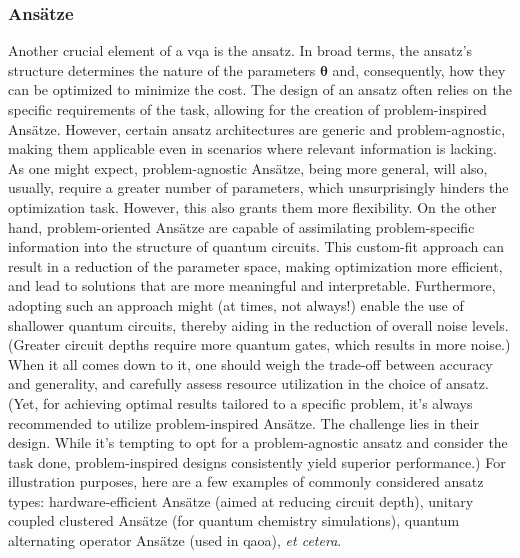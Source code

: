 \subsubsection*{\small Ansätze}
Another crucial element of a \acrshort{vqa} is the ansatz. In broad terms, the ansatz's structure determines the nature of the parameters $\boldsymbol{\theta}$ and, consequently, how they can be optimized to minimize the cost. The design of an ansatz often relies on the specific requirements of the task, allowing for the creation of problem-inspired Ansätze. However, certain ansatz architectures are generic and problem-agnostic, making them applicable even in scenarios where relevant information is lacking. As one might expect, problem-agnostic Ansätze, being more general, will also, usually, require a greater number of parameters, which unsurprisingly hinders the optimization task. However, this also grants them more flexibility. On the other hand, problem-oriented Ansätze are capable of assimilating problem-specific information into the structure of quantum circuits. This custom-fit approach can result in a reduction of the parameter space, making optimization more efficient, and lead to solutions that are more meaningful and interpretable. Furthermore, adopting such an approach might (at times, not always!) enable the use of shallower quantum circuits, thereby aiding in the reduction of overall noise levels. (Greater circuit depths require more quantum gates, which results in more noise.) When it all comes down to it, one should weigh the trade-off between accuracy and generality, and carefully assess resource utilization in the choice of ansatz. (Yet, for achieving optimal results tailored to a specific problem, it's always recommended to utilize problem-inspired Ansätze. The challenge lies in their design. While it's tempting to opt for a problem-agnostic ansatz and consider the task done, problem-inspired designs consistently yield superior performance.) For illustration purposes, here are a few examples of commonly considered ansatz types: hardware-efficient Ansätze (aimed at reducing circuit depth), unitary coupled clustered Ansätze (for quantum chemistry simulations), quantum alternating operator Ansätze (used in \acrshort{qaoa}), \textit{et cetera}.

